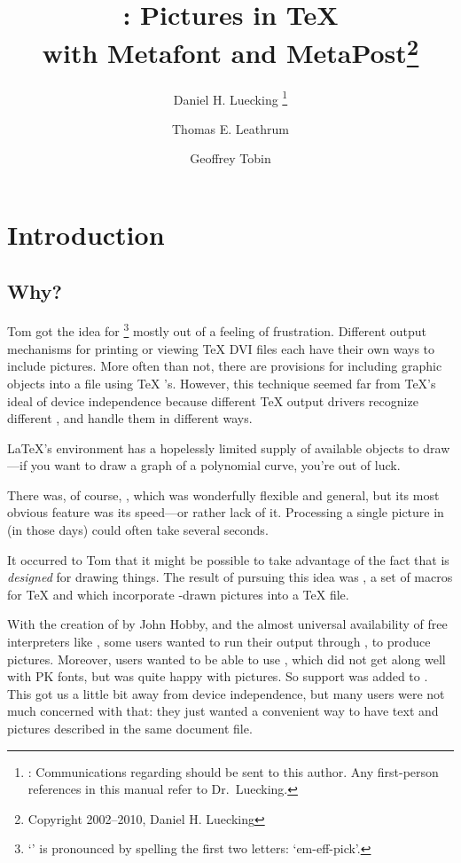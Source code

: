 \documentclass[letterpaper]{article}
\title{\Mfp{}: Pictures in \TeX{}\\ with Metafont and
MetaPost\thanks{Copyright 2002--2010, Daniel H. Luecking}}
\author{%
Daniel H. Luecking%
    \thanks{\email {luecking@uark.edu}: Communications regarding \mfp{}
    should be sent to this author. Any first-person references in this
    manual refer to Dr.~Luecking.}
\and Thomas E. Leathrum
\and Geoffrey Tobin}
\date{\mfpdate}
\begin{document}
\maketitle
\tableofcontents

\clearpage
{}

\chapter{Introduction}\label{introduction}
\thispagestyle{plain}

\section{Why?}\label{why}

Tom got the idea for \mfp{}%
    \footnote{`\Mfp{}' is pronounced by spelling the first two letters:
    `em-eff-pick'.}
mostly out of a feeling of frustration. Different output mechanisms for
printing or viewing \TeX{} DVI files each have their own ways to include
pictures.  More often than not, there are provisions for including
graphic objects into a  file using \TeX{} 's.
However, this technique seemed far from \TeX{}'s ideal of device
independence because different \TeX{} output drivers recognize different
, and handle them in different ways.

\LaTeX{}'s  environment has a hopelessly limited supply of
available objects to draw---if you want to draw a graph of a polynomial
curve, you're out of luck.

There was, of course, \PiCTeX{}, which was wonderfully flexible and
general, but its most obvious feature was its speed---or rather lack of
it. Processing a single picture in \PiCTeX{} (in those days) could often
take several seconds.

It occurred to Tom that it might be possible to take advantage of the
fact that \MF{} is \emph{designed} for drawing things. The result of
pursuing this idea was \mfp{}, a set of macros for \TeX{} and
\MF{} which incorporate \MF{}-drawn pictures into a \TeX{} file.

With the creation of \MP{} by John Hobby, and the almost universal
availability of free \PS{} interpreters like \GS, some \mfp{} users
wanted to run their \mfp{} output through \MP{}, to produce \PS{}
pictures. Moreover, users wanted to be able to use \pdfTeX{}, which did
not get along well with PK fonts, but was quite happy with \MP{}
pictures. So \MP{} support was added to \mfp{}. This got us a little bit
away from device independence, but many users were not much concerned
with that: they just wanted a convenient way to have text and pictures
described in the same document file.
\end{document}
